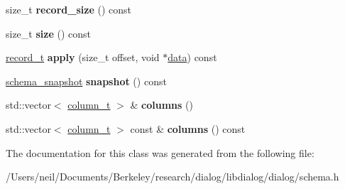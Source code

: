 \begin{DoxyCompactItemize}
size\+\_\+t {\bfseries record\+\_\+size} () const
\item 
\mbox{\label{classdialog_1_1schema__t_a3d2e740a271980d5cc81006e596b5132}} 
size\+\_\+t {\bfseries size} () const
\item 
\mbox{\label{classdialog_1_1schema__t_a5f76bfa3371ed66b23822da545c9269b}} 
\hyperlink{structdialog_1_1record__t}{record\+\_\+t} {\bfseries apply} (size\+\_\+t offset, void $\ast$\hyperlink{structdialog_1_1data}{data}) const
\item 
\mbox{\label{classdialog_1_1schema__t_a3cd8aa14aa940f08754e81d1d4abc5f1}} 
\hyperlink{classdialog_1_1schema__snapshot}{schema\+\_\+snapshot} {\bfseries snapshot} () const
\item 
\mbox{\label{classdialog_1_1schema__t_ab13804f7faa93b409d9f40dffca57d7a}} 
std\+::vector$<$ \hyperlink{classdialog_1_1column__t}{column\+\_\+t} $>$ \& {\bfseries columns} ()
\item 
\mbox{\label{classdialog_1_1schema__t_a69dc84b5994be50dda708fa17b688a9c}} 
std\+::vector$<$ \hyperlink{classdialog_1_1column__t}{column\+\_\+t} $>$ const  \& {\bfseries columns} () const
\end{DoxyCompactItemize}


The documentation for this class was generated from the following file\+:\begin{DoxyCompactItemize}
\item 
/\+Users/neil/\+Documents/\+Berkeley/research/dialog/libdialog/dialog/schema.\+h\end{DoxyCompactItemize}
